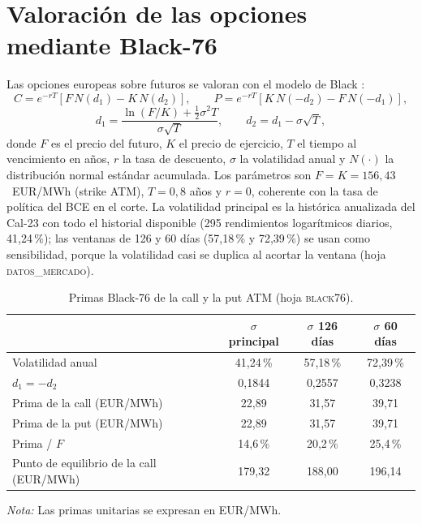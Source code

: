 \documentclass[11pt,letterpaper]{article}
\theoremstyle{plain}
\theoremstyle{definition}
\theoremstyle{remark}
\numberwithin{equation}{section}
\newcommand{\pc}{\mbox{\,\%}}
\begin{document}
\section{Valoración de las opciones mediante Black-76}\label{sec:val}

Las opciones europeas sobre futuros se valoran con el modelo de Black \cite{black}:
\begin{equation}
C=e^{-rT}\left[F\,N(d_1)-K\,N(d_2)\right],\qquad
P=e^{-rT}\left[K\,N(-d_2)-F\,N(-d_1)\right],\label{eq:b76}
\end{equation}
\begin{equation*}
d_1=\frac{\ln(F/K)+\tfrac{1}{2}\sigma^{2}T}{\sigma\sqrt{T}},\qquad d_2=d_1-\sigma\sqrt{T},
\end{equation*}
donde $F$ es el precio del futuro, $K$ el precio de ejercicio, $T$ el tiempo al vencimiento en años, $r$ la tasa de descuento, $\sigma$ la volatilidad anual y $N(\cdot)$ la distribución normal estándar acumulada. Los parámetros son $F=K=156{,}43$~EUR/MWh (strike ATM), $T=0{,}8$ años y $r=0$, coherente con la tasa de política del BCE en el corte. La volatilidad principal es la histórica anualizada del Cal-23 con todo el historial disponible (295 rendimientos logarítmicos diarios, 41,24\pc{}); las ventanas de 126 y 60 días (57,18\pc{} y 72,39\pc{}) se usan como sensibilidad, porque la volatilidad casi se duplica al acortar la ventana (hoja \textsc{datos\_mercado}).


\begin{table}[H]
    \centering\small
    \caption{Primas Black-76 de la call y la put ATM
    (hoja \textsc{black76}).}
    \label{tab:primas}
    \begin{tabular}{@{}lccc@{}}
        \toprule
        & $\sigma$ principal & $\sigma$ 126 días & $\sigma$ 60 días\\
        \midrule
        Volatilidad anual & 41,24\pc{} & 57,18\pc{} & 72,39\pc{}\\
        $d_1=-d_2$ & 0,1844 & 0,2557 & 0,3238\\
        Prima de la call (EUR/MWh) & 22,89 & 31,57 & 39,71\\
        Prima de la put (EUR/MWh) & 22,89 & 31,57 & 39,71\\
        Prima / $F$ & 14,6\pc{} & 20,2\pc{} & 25,4\pc{}\\
        Punto de equilibrio de la call (EUR/MWh)
            & 179,32 & 188,00 & 196,14\\
        \bottomrule
    \end{tabular}

    \par\vspace{3pt}
    \begin{minipage}{0.95\linewidth}
        \footnotesize
        \textit{Nota:} Las primas unitarias se expresan en EUR/MWh.
    \end{minipage}
\end{table}
\end{document}
